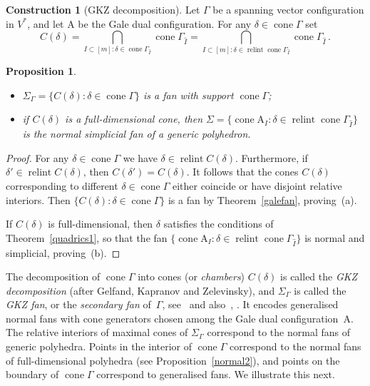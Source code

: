 \documentclass[a4paper]{amsart}
\newtheorem{proposition}[theorem]{Proposition}
\theoremstyle{definition}
\newtheorem{construction}[theorem]{Construction}
\theoremstyle{remark}
\numberwithin{equation}{section}
\def\cone{\mathop{\mathrm{cone}}}
\def\relint{\mathop{\mathrm{relint}}}
\newcommand{\<}{\langle}
\renewcommand{\>}{\rangle}
\begin{document}
\begin{construction}[GKZ decomposition]
Let $\Gamma$ be a spanning vector configuration in $V^*$, and let $\mathrm A$ be the Gale dual configuration. For any $\delta\in \cone\Gamma$ set
\[
  C(\delta)=\bigcap_{I\subset[m]\colon\delta\in\cone\Gamma_{\widehat I}}
  \cone\Gamma_{\widehat I}=
  \bigcap_{I\subset[m]\colon\delta\in\relint\cone\Gamma_{\widehat I}}
  \cone\Gamma_{\widehat I}\,.
\]

\begin{proposition}
\begin{itemize}
\item[(a)] $\Sigma_\Gamma=\{C(\delta)\colon\delta\in\cone\Gamma\}$ is a fan with support $\cone\Gamma$;

\item[(b)] if $C(\delta)$ is a full-dimensional cone, then $\Sigma=\{\cone\mathrm A_I\colon\delta\in\relint\cone\Gamma_{\widehat I}\}$ is the normal simplicial fan of a generic polyhedron.
\end{itemize}
\end{proposition}
\begin{proof}
For any $\delta\in\cone\Gamma$ we have $\delta\in\relint C(\delta)$. Furthermore, if $\delta'\in\relint C(\delta)$, then $C(\delta')=C(\delta)$. It follows that the cones $C(\delta)$ corresponding to different $\delta\in\cone\Gamma$ either coincide or have disjoint relative interiors. Then $\{C(\delta)\colon\delta\in\cone\Gamma\}$ is a fan by Theorem~\ref{galefan}, proving~(a).

If $C(\delta)$ is full-dimensional, then $\delta$ satisfies the conditions of Theorem~\ref{quadrics1}, so that the fan $\{\cone\mathrm A_I\colon\delta\in\relint\cone\Gamma_{\widehat I}\}$ is normal and simplicial, proving~(b). 
\end{proof}

The decomposition of $\cone\Gamma$ into cones (or \emph{chambers}) $C(\delta)$ is called the \emph{GKZ decomposition} (after Gelfand, Kapranov and Zelevinsky), and $\Sigma_\Gamma$
is called the \emph{GKZ fan}, or the \emph{secondary fan} of~$\Gamma$, see~\cite[Chapter~7]{g-k-m91} and also~\cite{od-pa91}, \cite[\S2.2.2]{a-d-h-l15}.
It encodes generalised normal fans with cone generators chosen among the Gale dual configuration~$\mathrm A$. The relative interiors of maximal cones of 
$\Sigma_\Gamma$ correspond to the normal fans of generic polyhedra. Points in 
the interior of $\cone\Gamma$ correspond to the normal fans of full-dimensional polyhedra (see Proposition~\ref{normal2}), and points on the boundary of $\cone\Gamma$ correspond to generalised fans. We illustrate this next.
 \end{construction}
\end{document}
